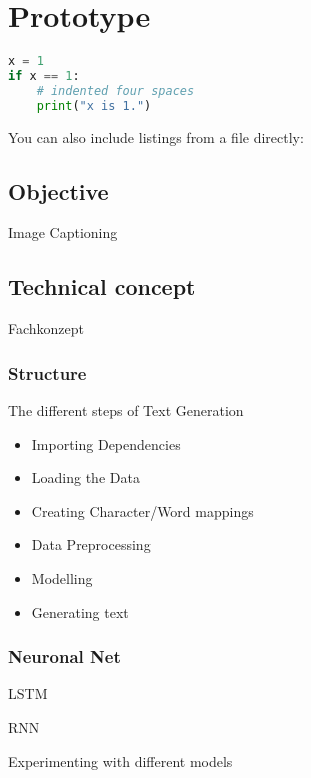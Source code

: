 \chapter{Prototype}\label{ch:proto}

\begin{lstlisting}[language=Python,caption={This is an example of inline listing},captionpos=b]
x = 1
if x == 1:
    # indented four spaces
    print("x is 1.")

\end{lstlisting}

You can also include listings from a file directly:



\section{Objective}

Image Captioning

\section{Technical concept}

Fachkonzept

\subsection{Structure}

The different steps of Text Generation

\begin{itemize}
\item Importing Dependencies
\item Loading the Data
\item Creating Character/Word mappings
\item Data Preprocessing
\item Modelling
\item Generating text
\end{itemize}

\subsection{Neuronal Net}\label{ss:nn}

LSTM

RNN


Experimenting with different models

